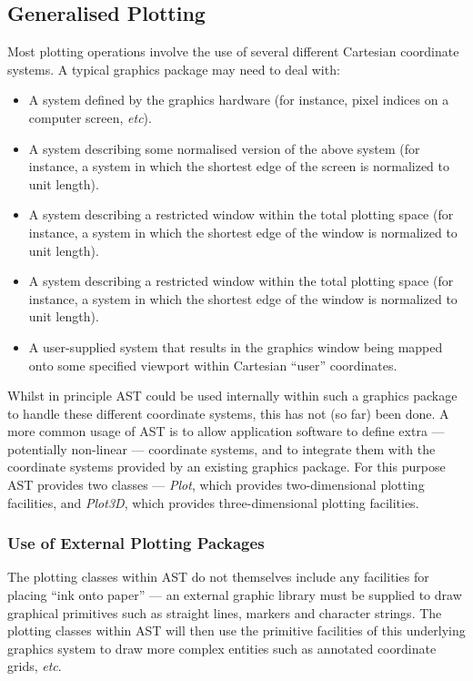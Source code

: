 \documentclass[final,authoryear,5p,times,twocolumn]{elsarticle}
\begin{document}
\subsection{Generalised Plotting}

Most plotting operations involve the use of several different Cartesian
coordinate systems. A typical graphics package may need to deal with:

\begin{itemize}
\item A system defined by the graphics hardware (for instance, pixel indices
on a computer screen, \emph{etc}).

\item A system describing some normalised version of the above system (for
instance, a system in which the shortest edge of the screen is normalized
to unit length).

\item A system describing a restricted window within the total plotting space
(for instance, a system in which the shortest edge of the window is normalized
to unit length).

\item A system describing a restricted window within the total plotting space
(for instance, a system in which the shortest edge of the window is normalized
to unit length).

\item A user-supplied system that results in the graphics window being mapped
onto some specified viewport within Cartesian ``user'' coordinates.

\end{itemize}

Whilst in principle AST could be used internally within such a graphics
package to handle these different coordinate systems, this has not (so
far) been done. A more common usage of AST is to allow application
software to define extra --- potentially non-linear --- coordinate
systems, and to integrate them with the coordinate systems provided by an
existing graphics package. For this purpose AST provides two classes ---
\emph{Plot}, which provides two-dimensional plotting facilities, and
\emph{Plot3D}, which provides three-dimensional plotting facilities.

\subsubsection{Use of External Plotting Packages}
The plotting classes within AST do not themselves include any facilities
for placing ``ink onto paper'' --- an external graphic library must be
supplied to draw graphical primitives such as straight lines, markers and
character strings. The plotting classes within AST will then use the
primitive facilities of this underlying graphics system to draw more complex
entities such as annotated coordinate grids, \emph{etc}.
\end{document}
